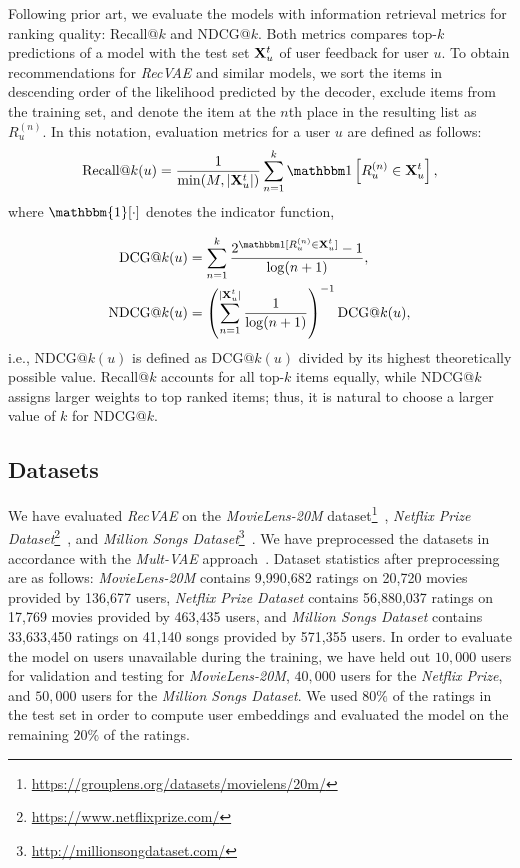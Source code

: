 \documentclass[sigconf,authorversion]{acmart}
\def\XX{{\bf X}}
\begin{document}
Following prior art, we evaluate the models with information retrieval metrics for ranking quality: Recall@$k$ and NDCG@$k$. Both metrics compares top-$k$ predictions of a model with the test set $\XX_u^t$ of user feedback for user $u$.
To obtain recommendations for \emph{RecVAE} and similar models, we sort the items in descending order of the likelihood predicted by the decoder, exclude items from the training set, and denote the item at the $n$th place in the resulting list as $R_u^{(n)}$. In this notation, evaluation metrics for a user $u$ are defined as follows:
\begin{equation}
\mathrm{Recall@}k(u) = \frac{1}{\min(M, |\XX_u^t|)}\sum_{n=1}^k {\mathbbm 1}\left[R_u^{(n)} \in \XX_u^t\right],
\end{equation}
where $\mathbbm{1}[\cdot]$ denotes the indicator function,

\begin{equation}
\begin{aligned}
\mathrm{DCG@}k(u) &= \sum_{n=1}^k \frac{2^{{\mathbbm 1}[R_u^{(n)} \in \XX_u^t]} - 1}{\log(n+1)},\\ 
\mathrm{NDCG@}k(u) &= \left(\sum_{n=1}^{|\XX_u^t|}\frac1{\log(n+1)}\right)^{-1} \mathrm{DCG@}k(u),
\end{aligned}
\end{equation}
i.e., $\mathrm{NDCG@}k(u)$ is defined as $\mathrm{DCG@}k(u)$ divided by its highest theoretically possible value.
Recall@$k$ accounts for all top-$k$ items equally, while NDCG@$k$ assigns larger weights to top ranked items; thus, it is natural to choose a larger value of $k$ for NDCG@$k$.


\subsection{Datasets}

We have evaluated \emph{RecVAE} on the \emph{MovieLens-20M} dataset\footnote{\url{https://grouplens.org/datasets/movielens/20m/}}~\cite{MovieLens}, \emph{Netflix Prize Dataset}\footnote{\url{https://www.netflixprize.com/}}~\cite{netflix}, and \emph{Million Songs Dataset}\footnote{\url{http://millionsongdataset.com/}}~\cite{songdata}.
We have preprocessed the datasets in accordance with the \emph{Mult-VAE} approach~\cite{liang2018variational}.
Dataset statistics after preprocessing are as follows:
\emph{MovieLens-20M} contains 9{,}990{,}682 ratings on 20{,}720 movies provided by 136{,}677 users,
\emph{Netflix Prize Dataset} contains 56{,}880{,}037 ratings on 17{,}769 movies provided by 463{,}435 users, and
\emph{Million Songs Dataset} contains 33{,}633{,}450  ratings on 41{,}140 songs provided by 571{,}355 users. 
In order to evaluate the model on users unavailable during the training, we have held out $10{,}000$ users for validation and testing for \emph{MovieLens-20M}, $40{,}000$ users for the \emph{Netflix Prize}, and $50{,}000$ users for the \emph{Million Songs Dataset}. We used $80\%$ of the ratings in the test set in order to compute user embeddings and evaluated the model on the remaining $20\%$ of the ratings.
\end{document}
